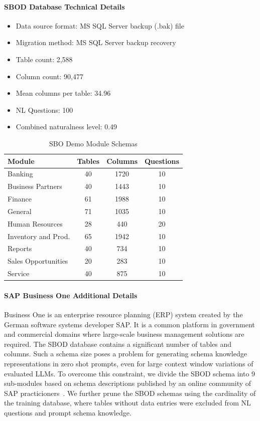 \paragraph{SBOD Database Technical Details}
\begin{itemize}
  \item Data source format: MS SQL Server backup (.bak) file
  \item Migration method: MS SQL Server backup recovery
  \item Table count: 2,588
  \item Column count: 90,477
  \item Mean columns per table: 34.96
  \item NL Questions: 100
  \item Combined naturalness level: 0.49 
\end{itemize}

\begin{table}[th]
  \centering
  \caption{SBO Demo Module Schemas}
  \begin{tabular}{p{4cm}ccc}
  \toprule
  \textbf{Module} & \textbf{Tables} & \textbf{Columns} & \textbf{Questions} \\
  \midrule
  Banking & 40 & 1720 & 10 \\
  Business Partners & 40 & 1443 & 10 \\
  Finance & 61 & 1988 & 10 \\
  General & 71 & 1035 & 10 \\
  Human Resources & 28 & 440 & 20 \\
  Inventory and Prod. & 65 & 1942 & 10 \\
  Reports & 40 & 734 & 10 \\
  Sales Opportunities & 20 & 283 & 10 \\
  Service & 40 & 875 & 10 \\
  \bottomrule
  \end{tabular}
  \label{table:sapmodulechemas-appendix}
\end{table}

\paragraph{SAP Business One Additional Details}
Business One is an enterprise resource planning (ERP) system created by the German software systems developer SAP.
It is a common platform in government and commercial domains where large-scale business management solutions are required.
The SBOD database contains a significant number of tables and columns.
Such a schema size poses a problem for generating schema knowledge representations in zero shot prompts, even for large context window variations of evaluated LLMs.
To overcome this constraint, we divide the SBOD schema into 9 sub-modules based on schema descriptions published by an online community of SAP practicioners~\cite{sap-erpref}.
We further prune the SBOD schemas using the cardinality of the training database, where tables without data entries were excluded from NL questions and prompt schema knowledge.




